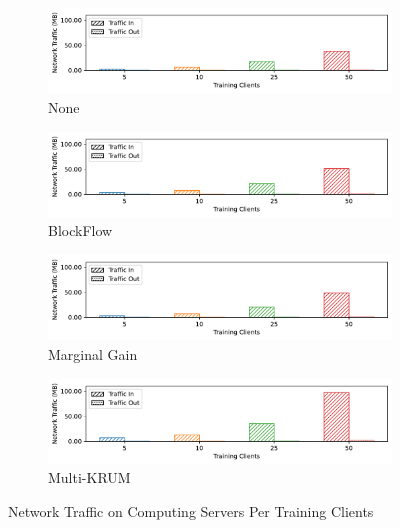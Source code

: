 \begin{figure}[!ht]
    \centering
    \begin{subfigure}[b]{0.49\textwidth}
        \centering
        \includegraphics[width=\textwidth]{graphics/clients/net_none_server.pdf}
        \caption{None}
    \end{subfigure}
    \hfill
    \begin{subfigure}[b]{0.49\textwidth}
        \centering
        \includegraphics[width=\textwidth]{graphics/clients/net_blockflow_server.pdf}
        \caption{BlockFlow}
    \end{subfigure}
    \hfill
    \begin{subfigure}[b]{0.49\textwidth}
        \centering
        \includegraphics[width=\textwidth]{graphics/clients/net_marginalgain_server.pdf}
        \caption{Marginal Gain}
    \end{subfigure}
    \hfill
    \begin{subfigure}[b]{0.49\textwidth}
        \centering
        \includegraphics[width=\textwidth]{graphics/clients/net_multikrum_server.pdf}
        \caption{Multi-KRUM}
    \end{subfigure}
    \caption{Network Traffic on Computing Servers Per Training Clients}
    \label{fig:net_clients_degree_server}
\end{figure}

